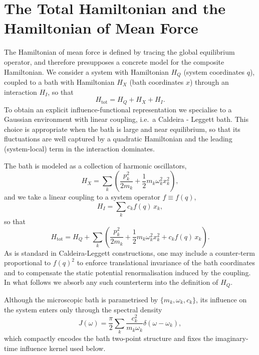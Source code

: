 \section{\label{sec:model}The Total Hamiltonian and the Hamiltonian of Mean Force}
The Hamiltonian of mean force is defined by tracing the global equilibrium
operator, and therefore presupposes a concrete model for the composite
Hamiltonian. We consider a system with Hamiltonian $H_Q$ (system coordinates
$q$), coupled to a bath with Hamiltonian $H_X$ (bath coordinates $x$) through an
interaction $H_I$, so that
\begin{equation}
    H_{\mathrm{tot}}=H_Q+H_X+H_I.
    \label{eq:Htot_model}
\end{equation}
To obtain an explicit influence-functional representation we specialise to a
Gaussian environment with linear coupling, i.e.\ a Caldeira - Leggett bath. This
choice is appropriate when the bath is large and near equilibrium, so that its
fluctuations are well captured by a quadratic Hamiltonian and the leading
(system-local) term in the interaction dominates.

The bath is modeled as a collection of harmonic oscillators,
\begin{equation}
    H_X=\sum_k\left(\frac{p_k^2}{2m_k}+\frac{1}{2}m_k\omega_k^2 x_k^2\right),
    \label{eq:HX_model}
\end{equation}
and we take a linear coupling to a system operator $f\equiv f(q)$,
\begin{equation}
    H_I=\sum_k c_k f(q)\, x_k,
    \label{eq:HI_model}
\end{equation}
so that
\begin{equation}
    H_{\mathrm{tot}} = H_Q + \sum_k \left( \frac{p_k^2}{2m_k} + \frac{1}{2}m_k\omega_k^2 x_k^2 + c_k f(q)\, x_k \right).
    \label{eq:Htot_full}
\end{equation}
As is standard in Caldeira-Leggett constructions, one may include a counter-term
proportional to $f(q)^2$ to enforce translational invariance of the bath
coordinates and to compensate the static potential renormalisation induced by
the coupling. In what follows we absorb any such counterterm into the
definition of $H_Q$.

Although the microscopic bath is parametrised by $\{m_k,\omega_k,c_k\}$, its
influence on the system enters only through the spectral density
\begin{equation}
    J(\omega) = \frac{\pi}{2} \sum_k \frac{c_k^2}{m_k \omega_k} \delta(\omega-\omega_k),
    \label{eq:spectral_density}
\end{equation}
which compactly encodes the bath two-point structure and fixes the imaginary-time
influence kernel used below.


